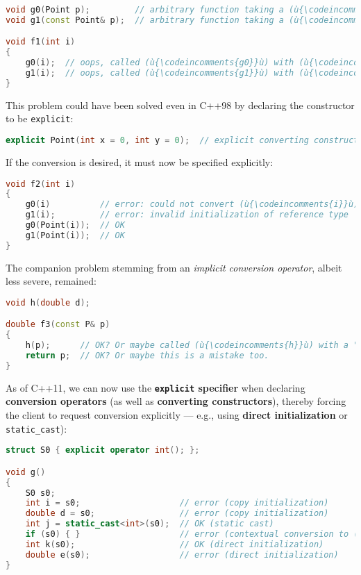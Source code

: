 \begin{lstlisting}[language=C++]
void g0(Point p);         // arbitrary function taking a (ù{\codeincomments{Point}}ù) object by value
void g1(const Point& p);  // arbitrary function taking a (ù{\codeincomments{Point}}ù) by (ù{\codeincomments{const}}ù) reference

void f1(int i)
{
    g0(i);  // oops, called (ù{\codeincomments{g0}}ù) with (ù{\codeincomments{Point(i, 0)}}ù) by mistake
    g1(i);  // oops, called (ù{\codeincomments{g1}}ù) with (ù{\codeincomments{Point(i, 0)}}ù) by mistake
}
\end{lstlisting}
    
\noindent This problem could have been solved even in C++98 by declaring the
constructor to be \texttt{explicit}:

\begin{lstlisting}[language=C++]
explicit Point(int x = 0, int y = 0);  // explicit converting constructor
\end{lstlisting}
    
\noindent If the conversion is desired, it must now be specified explicitly:

\begin{lstlisting}[language=C++]
void f2(int i)
{
    g0(i)          // error: could not convert (ù{\codeincomments{i}}ù) from (ù{\codeincomments{int}}ù) to (ù{\codeincomments{Point}}ù)
    g1(i);         // error: invalid initialization of reference type
    g0(Point(i));  // OK
    g1(Point(i));  // OK
}
\end{lstlisting}
    
\noindent The companion problem stemming from an \emph{implicit conversion
operator}, albeit less severe, remained:

\begin{lstlisting}[language=C++]
void h(double d);

double f3(const P& p)
{
    h(p);      // OK? Or maybe called (ù{\codeincomments{h}}ù) with a "hypotenuse" by mistake
    return p;  // OK? Or maybe this is a mistake too.
}
\end{lstlisting}
    
\noindent As of C++11, we can now use the \textbf{\texttt{explicit} specifier}
when declaring \textbf{conversion operators} (as well as
\textbf{converting constructors}), thereby forcing the client to request
conversion explicitly --- e.g., using \textbf{direct initialization} or
\texttt{static\_cast}):

\begin{lstlisting}[language=C++]
struct S0 { explicit operator int(); };

void g()
{
    S0 s0;
    int i = s0;                    // error (copy initialization)
    double d = s0;                 // error (copy initialization)
    int j = static_cast<int>(s0);  // OK (static cast)
    if (s0) { }                    // error (contextual conversion to (ù{\codeincomments{bool}}ù))
    int k(s0);                     // OK (direct initialization)
    double e(s0);                  // error (direct initialization)
}
\end{lstlisting}
    
